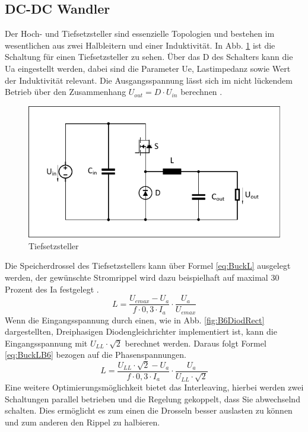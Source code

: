 		\subsection{DC-DC Wandler}
		Der Hoch- und Tiefsetzsteller sind essenzielle Topologien und bestehen im wesentlichen aus zwei Halbleitern und einer Induktivität. In Abb. \ref{fig:buck} ist die Schaltung für einen Tiefsetzsteller zu sehen. Über das \gls{D} des Schalters kann die \gls{Ua} eingestellt werden, dabei sind die Parameter \gls{Ue}, Lastimpedanz sowie Wert der Induktivität relevant. Die Ausgangsspannung lässt sich im nicht lückendem Betrieb über den Zusammenhang $U_{out}=D\cdot U_{in} $ berechnen \cite{schmidtwalter}.\\
		\begin{figure}
			\centering
			\includegraphics[width=0.7\linewidth]{content/Grafiken/Buck}
			\caption[Tiefsetzsteller]{Tiefsetzsteller}
			\label{fig:buck}
		\end{figure}
		Die Speicherdrossel des Tiefsetzstellers kann über Formel \ref{eq:BuckL} ausgelegt werden, der gewünschte Stromrippel wird dazu beispielhaft auf maximal 30 Prozent des \gls{Ia} festgelegt \cite{schmidtwalter}.
		\begin{equation}
			\label{eq:BuckL}
			L=\dfrac{U_{emax}-U_{a}}{f\cdot 0,3 \cdot I_{a}}\cdot \dfrac{U_{a}}{U_{emax}}
		\end{equation}
		Wenn die Eingangsspannung durch einen, wie in Abb. \ref{fig:B6DiodRect} dargestellten, Dreiphasigen Diodengleichrichter implementiert ist, kann die Eingangsspannung mit $U_{LL} \cdot \sqrt{2}$ berechnet werden. Daraus folgt Formel \ref{eq:BuckLB6} bezogen auf die Phasenspannungen. \\
		\begin{equation}
			\label{eq:BuckLB6}
			L=\dfrac{U_{LL} \cdot \sqrt{2}-U_{a}}{f\cdot 0,3 \cdot I_{a}}\cdot \dfrac{U_{a}}{U_{LL} \cdot \sqrt{2}}
		\end{equation}
		Eine weitere Optimierungsmöglichkeit bietet das Interleaving, hierbei werden zwei Schaltungen parallel betrieben und die Regelung gekoppelt, dass Sie abwechselnd schalten. Dies ermöglicht es zum einen die Drosseln besser auslasten zu können und zum anderen den Rippel zu halbieren. 
		
